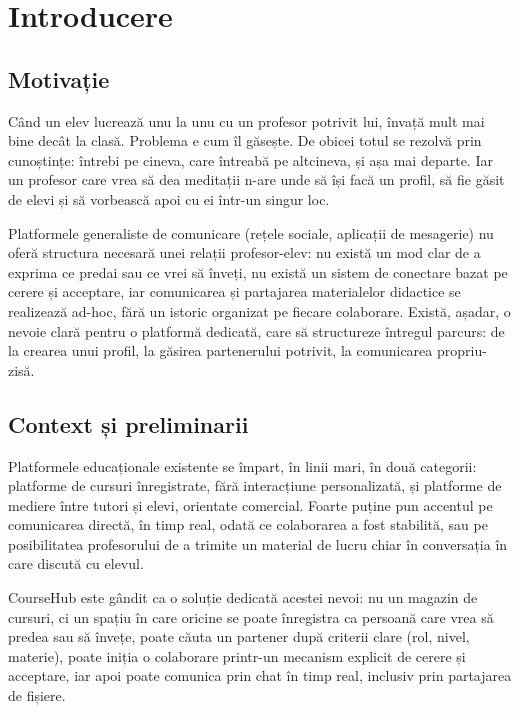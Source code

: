 \chapter{Introducere}

\section{Motivație}

Când un elev lucrează unu la unu cu un profesor potrivit lui, învață mult mai bine
decât la clasă. Problema e cum îl găsește. De obicei totul se rezolvă prin
cunoștințe: întrebi pe cineva, care întreabă pe altcineva, și așa mai departe. Iar
un profesor care vrea să dea meditații n-are unde să își facă un profil, să fie
găsit de elevi și să vorbească apoi cu ei într-un singur loc.

Platformele generaliste de comunicare (rețele sociale, aplicații de mesagerie) nu oferă
structura necesară unei relații profesor-elev: nu există un mod clar de a exprima ce
predai sau ce vrei să înveți, nu există un sistem de conectare bazat pe cerere și acceptare,
iar comunicarea și partajarea materialelor didactice se realizează ad-hoc, fără un istoric
organizat pe fiecare colaborare. Există, așadar, o nevoie clară pentru o platformă dedicată,
care să structureze întregul parcurs: de la crearea unui profil, la găsirea partenerului
potrivit, la comunicarea propriu-zisă.

\section{Context și preliminarii}

Platformele educaționale existente se împart, în linii mari, în două categorii:
platforme de cursuri înregistrate, fără interacțiune personalizată, și platforme de
mediere între tutori și elevi, orientate comercial. Foarte puține pun accentul pe
comunicarea directă, în timp real, odată ce colaborarea a fost stabilită, sau pe
posibilitatea profesorului de a trimite un material de lucru chiar în conversația
în care discută cu elevul.

CourseHub este gândit ca o soluție dedicată acestei nevoi: nu un magazin de cursuri,
ci un spațiu în care oricine se poate înregistra ca persoană care vrea să predea sau
să învețe, poate căuta un partener după criterii clare (rol, nivel, materie), poate
iniția o colaborare printr-un mecanism explicit de cerere și acceptare, iar apoi poate
comunica prin chat în timp real, inclusiv prin partajarea de fișiere.

